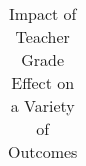 \begin{table}

\caption{Impact of Teacher Grade Effect on a Variety of Outcomes\label{tbl:results}}
\centering
\begin{tabular}[t]{}
\toprule

\bottomrule
\end{tabular}
\end{table}
